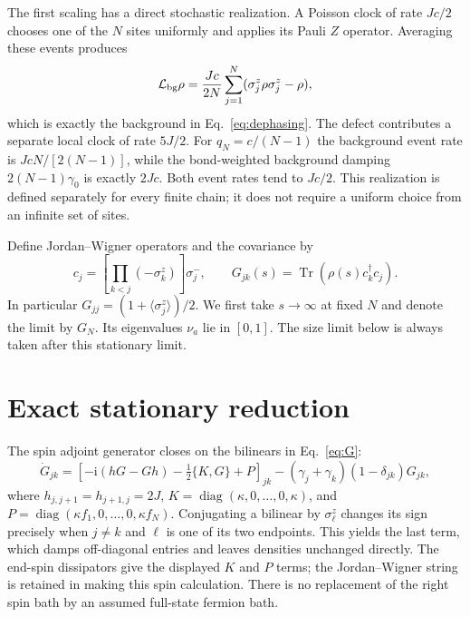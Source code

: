 \documentclass[11pt,a4paper]{article}
\newcommand{\tr}{\operatorname{Tr}}
\newcommand{\ii}{\mathrm{i}}
\begin{document}
The first scaling has a direct stochastic realization. A Poisson clock
of rate $Jc/2$ chooses one of the $N$ sites uniformly and applies its
Pauli $Z$ operator. Averaging these events produces
\begin{equation}
 \mathcal L_{\rm bg}\rho=
 \frac{Jc}{2N}\sum_{j=1}^N(\sigma_j^z\rho\sigma_j^z-\rho),
 \label{eq:clock}
\end{equation}
which is exactly the background in Eq.~\eqref{eq:dephasing}.
The defect contributes a separate local clock of rate $5J/2$.
For $q_N=c/(N-1)$ the background event rate is
$JcN/[2(N-1)]$, while the bond-weighted background damping
$2(N-1)\gamma_0$ is exactly $2Jc$. Both event rates tend to $Jc/2$.
This realization is defined separately for every finite chain; it does
not require a uniform choice from an infinite set of sites.

Define Jordan--Wigner operators and the covariance by
\begin{equation}
 c_j=\left[\prod_{k<j}(-\sigma_k^z)\right]\sigma_j^- ,
 \qquad G_{jk}(s)=\tr(\rho(s)c_k^\dagger c_j).
 \label{eq:G}
\end{equation}
In particular $G_{jj}=(1+\langle\sigma_j^z\rangle)/2$.
We first take $s\to\infty$ at fixed $N$ and denote the limit by $G_N$.
Its eigenvalues $\nu_a$ lie in $[0,1]$. The size limit below is always
taken after this stationary limit.

\section{Exact stationary reduction}
The spin adjoint generator closes on the bilinears in Eq.~\eqref{eq:G}:
\begin{equation}
 \dot G_{jk}=
 \left[-\ii(hG-Gh)-\tfrac12\{K,G\}+P\right]_{jk}
 -(\gamma_j+\gamma_k)(1-\delta_{jk})G_{jk},
 \label{eq:moment}
\end{equation}
where $h_{j,j+1}=h_{j+1,j}=2J$,
$K=\operatorname{diag}(\kappa,0,\ldots,0,\kappa)$, and
$P=\operatorname{diag}(\kappa f_1,0,\ldots,0,\kappa f_N)$.
Conjugating a bilinear by $\sigma_\ell^z$ changes its sign precisely
when $j\ne k$ and $\ell$ is one of its two endpoints. This yields the
last term, which damps off-diagonal entries and leaves densities
unchanged directly. The end-spin dissipators give the displayed $K$
and $P$ terms; the Jordan--Wigner string is retained in making this
spin calculation. There is no replacement of the right spin bath by
an assumed full-state fermion bath.
\end{document}
